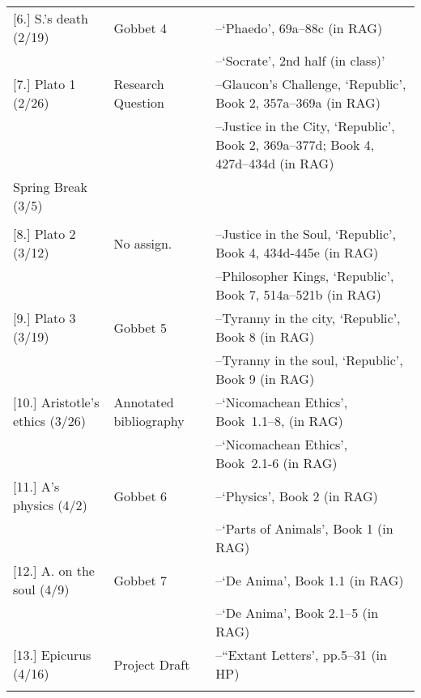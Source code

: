 \documentclass[article,oneside]{memoir}
\begin{document}
\begin{center}
\begin{longtable}{p{4.5cm}p{2cm}p{6cm}}
[6.] S.'s death (2/19)	   	& Gobbet 4		 & --`Phaedo', 69a--88c  (in RAG)   \\
			        					& 				 & --`Socrate', 2nd half (in class)' \\ [1.8\baselineskip]
  
[7.] Plato 1 (2/26)			 			& Research Question		& --Glaucon's Challenge, `Republic', Book 2, 357a--369a (in RAG)  \\
				     			 	& 	      			& --Justice in the City, `Republic', Book 2, 369a--377d; Book 4, 427d--434d (in RAG) \\  [1.8\baselineskip]

Spring Break (3/5)					& 				 & 	\\
								& 				 &   \\ [1.8\baselineskip]	

[8.] Plato 2	(3/12)					& No assign.		& --Justice in the Soul, `Republic', Book 4, 434d-445e (in RAG)\\
	            						&		      		& --Philosopher Kings, `Republic', Book 7, 514a--521b (in RAG) \\  [1.8\baselineskip]

[9.] Plato 3	(3/19)					& Gobbet 5		& --Tyranny in the city, `Republic', Book 8 (in RAG) \\
		            					&		      		& --Tyranny in the soul, `Republic', Book 9  (in RAG)\\  [1.8\baselineskip]


[10.] Aristotle's ethics	(3/26)			& Annotated bibliography		& --`Nicomachean Ethics', Book\ 1.1--8, (in RAG) \\
			    					& 				& --`Nicomachean Ethics', Book\ 2.1-6 (in RAG) \\ [1.8\baselineskip]


[11.] A's physics (4/2)			& Gobbet 6		& --`Physics', Book 2 (in RAG) \\ 
				   			   	&			      	& --`Parts of Animals', Book 1 (in RAG)  \\ [1.8\baselineskip]

						
[12.] A. on the soul (4/9)	      		& Gobbet 7		&  --`De Anima', Book 1.1 (in RAG) \\
				   			   	&			      	& --`De Anima', Book 2.1--5 (in RAG) \\  [1.8\baselineskip]

						 
[13.] Epicurus (4/16)	    				& Project Draft		& --``Extant Letters', pp.5--31 (in HP)\\
			      					&			      	&  \\ [1.8\baselineskip]


\end{longtable}
\end{center}
\end{document}
